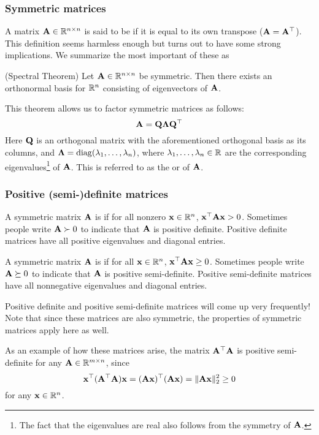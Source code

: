 \subsubsection{Symmetric matrices}
A matrix $\mathbf{A} \in \mathbb{R}^{n \times n}$ is said to be  if it is equal to its own transpose ($\mathbf{A} = \mathbf{A}^\top$).
This definition seems harmless enough but turns out to have some strong implications.
We summarize the most important of these as
\begin{theorem}
(Spectral Theorem)
Let $\mathbf{A} \in \mathbb{R}^{n \times n}$ be symmetric.
Then there exists an orthonormal basis for $\mathbb{R}^n$ consisting of eigenvectors of $\mathbf{A}$.
\end{theorem}
This theorem allows us to factor symmetric matrices as follows:
\[\mathbf{A} = \mathbf{Q}\mathbf{\Lambda}\mathbf{Q}^\top\]
Here $\mathbf{Q}$ is an orthogonal matrix with the aforementioned orthogonal basis as its columns, and $\mathbf{\Lambda} = \operatorname*{diag}(\lambda_1, \dots, \lambda_n)$, where $\lambda_1, \dots, \lambda_n \in \mathbb{R}$ are the corresponding eigenvalues\footnote{
        The fact that the eigenvalues are real also follows from the symmetry of $\mathbf{A}$.
} of $\mathbf{A}$.
This is referred to as the  or  of $\mathbf{A}$.

\subsubsection{Positive (semi-)definite matrices}
A symmetric matrix $\mathbf{A}$ is  if for all nonzero $\mathbf{x} \in \mathbb{R}^n$, $\mathbf{x}^\top\mathbf{A}\mathbf{x} > 0$.
Sometimes people write $\mathbf{A} \succ 0$ to indicate that $\mathbf{A}$ is positive definite.
Positive definite matrices have all positive eigenvalues and diagonal entries.

A symmetric matrix $\mathbf{A}$ is  if for all $\mathbf{x} \in \mathbb{R}^n$, $\mathbf{x}^\top\mathbf{A}\mathbf{x} \geq 0$.
Sometimes people write $\mathbf{A} \succeq 0$ to indicate that $\mathbf{A}$ is positive semi-definite.
Positive semi-definite matrices have all nonnegative eigenvalues and diagonal entries.

Positive definite and positive semi-definite matrices will come up very frequently!
Note that since these matrices are also symmetric, the properties of symmetric matrices apply here as well.

As an example of how these matrices arise, the matrix $\mathbf{A}^\top\mathbf{A}$ is positive semi-definite for any $\mathbf{A} \in \mathbb{R}^{m \times n}$, since
\[\mathbf{x}^\top (\mathbf{A}^\top\mathbf{A})\mathbf{x} = (\mathbf{A}\mathbf{x})^\top(\mathbf{A}\mathbf{x}) = \|\mathbf{A}\mathbf{x}\|_2^2 \geq 0\]
for any $\mathbf{x} \in \mathbb{R}^n$.

